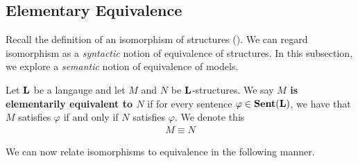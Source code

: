 \subsection{Elementary Equivalence}

Recall the definition of an isomorphism of structures (). We can regard isomorphism as a \textit{syntactic} notion of equivalence of structures. In this subsection, we explore a \textit{semantic} notion of equivalence of models.

\begin{boxdefinition}
    Let $\mathbf{L}$ be a langauge and let $M$ and $N$ be $\mathbf{L}$-structures. We say \textbf{$M$ is elementarily equivalent to $N$} if for every sentence $\varphi \in \mathbf{Sent}\!\left( \mathbf{L} \right)$, we have that $M$ satisfies $\varphi$ if and only if $N$ satisfies $\varphi$. We denote this
    \begin{align*}
        M \equiv N
    \end{align*}
\end{boxdefinition}

We can now relate isomorphisms to equivalence in the following manner.

